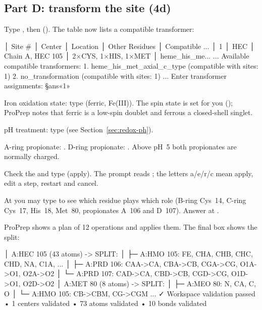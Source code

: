\subsection*{Part D: transform the site (4d)}

\begin{steps}
  \item Type , then  (). The table now lists a compatible transformer:
\begin{screen}
│ Site # │ Center │ Location         │ Other Residues      │ Compatible ...
│ 1      │ HEC    │ Chain A, HEC 105 │ 2×CYS, 1×HIS, 1×MET │ heme_his_me...
...
Available compatible transformers:
1. heme_his_met_axial_c_type (compatible with sites: 1)
2. no_transformation (compatible with sites: 1)
...
Enter transformer assignments: §ans«1»
\end{screen}
  \item Iron oxidation state: type  (ferric, Fe(III)).
        The spin state is set for you (); ProPrep notes that ferric is a low-spin doublet and ferrous a
        closed-shell singlet.
  \item pH treatment: type 
        (see Section~\ref{sec:redox-ph}).
  \item A-ring propionate: . D-ring propionate:
        . Above pH~5 both propionates are normally
        charged.
  \item Check the  and type  (apply). The
        prompt reads ; the letters a/e/r/c mean apply,
        edit a step, restart and cancel.
  \item At  you may type  to see
        which residue plays which role (B-ring Cys~14, C-ring Cys~17,
        His~18, Met~80, propionates A~106 and D~107). Answer  at
        .
  \item ProPrep shows a plan of 12 operations and applies them. The final box
        shows the split:
\begin{screen}
│ A:HEC 105 (43 atoms) -> SPLIT:
│   ├─ A:HMO 105: FE, CHA, CHB, CHC, CHD, NA, C1A, ...
│   ├─ A:PRD 106: CAA->CA, CBA->CB, CGA->CG, O1A->O1, O2A->O2
│   └─ A:PRD 107: CAD->CA, CBD->CB, CGD->CG, O1D->O1, O2D->O2
│ A:MET 80 (8 atoms) -> SPLIT:
│   ├─ A:MEO 80: N, CA, C, O
│   └─ A:HMO 105: CB->CBM, CG->CGM
...
✓ Workspace validation passed
  • 1 centers validated
  • 73 atoms validated
  • 10 bonds validated
\end{screen}
\end{steps}

